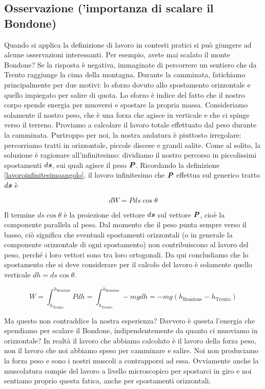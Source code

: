 \subsection*{Osservazione ('importanza di scalare il Bondone)}
Quando si applica la definizione di lavoro in contesti pratici si può
giungere ad alcune osservazioni interessanti. Per esempio, avete mai
scalato il monte Bondone? Se la risposta è negativa, immaginate di
percorrere un sentiero che da Trento raggiunge la cima della montagna.
Durante la camminata, fatichiamo principalmente per due motivi: lo
sforzo dovuto allo spostamento orizzontale e quello impiegato per
salire di quota. Lo sforzo è indice del fatto che il nostro corpo
spende energia per muoversi e spostare la propria massa. Consideriamo
solamente il nostro peso, che è una forza che agisce in verticale e
che ci spinge verso il terreno. Proviamo a calcolare il
lavoro totale effettuato dal peso durante la camminata.
Purtroppo per noi, la nostra andatura è piuttosto irregolare:
percorriamo tratti in orizzontale, piccole discese e grandi
salite. Come al solito, la soluzione è ragionare all'infinitesimo:
dividiamo il nostro percorso in piccolissimi spostamenti $d\textbf{\textit{s}}$,
sui quali agisce il peso $\textbf{\textit{P}}$. Ricordando la definizione
\ref{lavoroinfinitesimoangolo}, il lavoro infinitesimo che $\textbf{\textit{P}}$
effettua sul generico tratto $d\textbf{\textit{s}}$ è

\[ dW = P ds \cos\theta \]

\noindent Il termine $ds \cos\theta$ è la proiezione del vettore
$d\textbf{\textit{s}}$ sul vettore $\textbf{\textit{P}}$, cioè la componente
parallela al peso. Dal momento che il peso punta sempre verso il
basso, ciò significa che eventuali spostamenti orizzontali (o in
generale la componente orizzontale di ogni spostamento) non
contribuiscono al lavoro del peso, perché i loro vettori sono
tra loro ortogonali. Da qui concludiamo che lo spostamento
che si deve considerare per il calcolo del lavoro è solamente
quello verticale $dh = ds \cos\theta$.

\[ W = \int_{h_\text{Trento}}^{h_\text{Bondone}} Pdh = \int_{h_\text{Trento}}^{h_\text{Bondone}} -mg dh = -mg(h_\text{Bondone} - h_\text{Trento}) \]

Ma questo non contraddice la nostra esperienza? Davvero è
questa l'energia che spendiamo per scalare il Bondone,
indipendentemente da quanto ci muoviamo in orizzontale? In realtà
il lavoro che abbiamo calcolato è il lavoro della forza peso, non
il lavoro che noi abbiamo speso per camminare e salire. Noi non
produciamo la forza peso e sono i nostri muscoli a contrapporsi
ad essa. Ovviamente anche la muscolatura compie del lavoro a livello
microscopico per spostarci in giro e noi sentiamo proprio questa fatica, anche
per spostamenti orizzontali.

